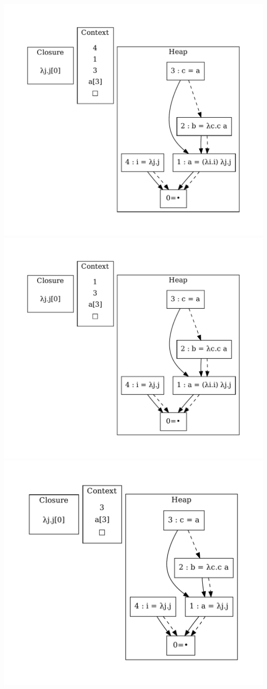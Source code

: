 \includegraphics[width=0.99\linewidth/2]{figures/15.pdf}
\includegraphics[width=0.99\linewidth/2]{figures/16.pdf}
\includegraphics[width=0.99\linewidth/2]{figures/17.pdf}

